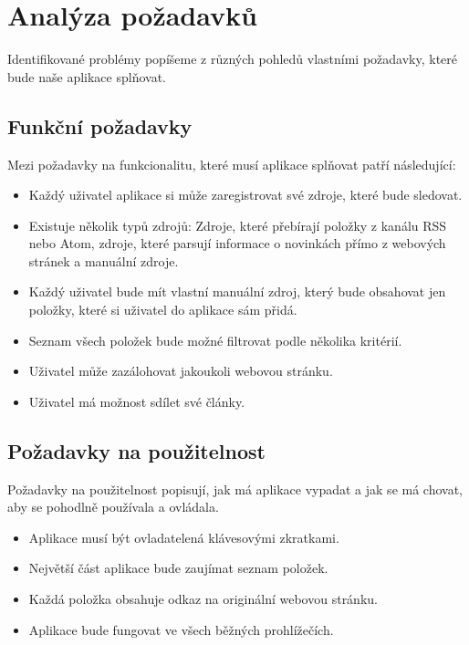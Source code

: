 \section{Analýza požadavků}

Identifikované problémy popíšeme z různých pohledů vlastními požadavky, které bude naše aplikace splňovat.

\subsection{Funkční požadavky}

Mezi požadavky na funkcionalitu, které musí aplikace splňovat patří následující:

\begin{itemize}
    \item Každý uživatel aplikace si může zaregistrovat své zdroje, které bude sledovat.
    \item Existuje několik typů zdrojů: Zdroje, které přebírají položky z kanálu RSS nebo Atom, zdroje, které parsují informace o novinkách přímo z webových stránek a manuální zdroje.
    \item Každý uživatel bude mít vlastní manuální zdroj, který bude obsahovat jen položky, které si uživatel do aplikace sám přidá.
    \item Seznam všech položek bude možné filtrovat podle několika kritérií.
	\item Uživatel může zazálohovat jakoukoli webovou stránku.
	\item Uživatel má možnost sdílet své články.
\end{itemize}

\subsection{Požadavky na použitelnost}

Požadavky na použitelnost popisují, jak má aplikace vypadat a jak se má chovat, aby se pohodlně používala a ovládala.

\begin{itemize}
    \item Aplikace musí být ovladatelená klávesovými zkratkami.
    \item Největší část aplikace bude zaujímat seznam položek.
    \item Každá položka obsahuje odkaz na originální webovou stránku.
    \item Aplikace bude fungovat ve všech běžných prohlížečích.
\end{itemize}

